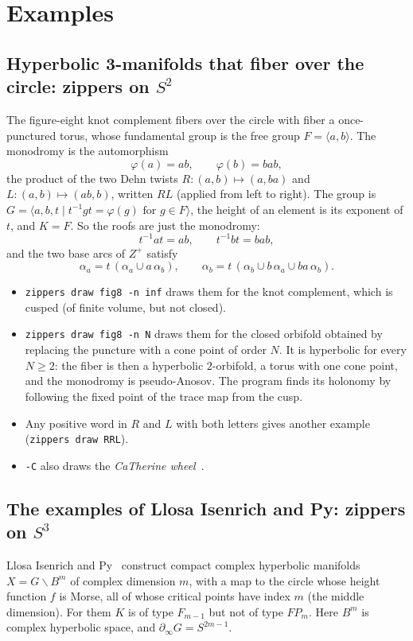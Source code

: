 \documentclass[11pt]{article}
\theoremstyle{remark}
\begin{document}
\section{Examples}

\subsection{Hyperbolic 3-manifolds that fiber over the circle: zippers on $S^2$}

The figure-eight knot complement fibers over the circle with fiber a once-punctured torus, whose fundamental group is the
free group $F=\langle a,b\rangle$. The monodromy is the automorphism
\[
\varphi(a)=ab,\qquad \varphi(b)=bab,
\]
the product of the two Dehn twists $R\colon(a,b)\mapsto(a,ba)$ and $L\colon(a,b)\mapsto(ab,b)$, written $RL$ (applied
from left to right). The group is $G=\langle a,b,t\mid t^{-1}gt=\varphi(g)\text{ for } g\in F\rangle$, the
height of an element is its exponent of $t$, and $K=F$. So the roofs are just the monodromy:
\[
t^{-1}at=ab,\qquad t^{-1}bt=bab,
\]
and the two base arcs of $Z^+$ satisfy
\[
\alpha_a=t\,(\alpha_a\cup a\,\alpha_b),\qquad \alpha_b=t\,(\alpha_b\cup b\,\alpha_a\cup ba\,\alpha_b).
\]
\begin{itemize}
\item \texttt{zippers draw fig8 -n inf} draws them for the knot complement, which is cusped (of finite volume, but not
closed).
\item \texttt{zippers draw fig8 -n N} draws them for the closed orbifold obtained by replacing the puncture with a cone point
of order $N$. It is hyperbolic for every $N\ge2$: the fiber is then a hyperbolic $2$-orbifold, a torus with one cone
point, and the monodromy is pseudo-Anosov. The program finds its holonomy by following the fixed point of the trace map
from the cusp.
\item Any positive word in $R$ and $L$ with both letters gives another example (\texttt{zippers draw RRL}).
\item \texttt{-C} also draws the \emph{CaTherine wheel}~\cite{CLwheels}.
\end{itemize}

\subsection{The examples of Llosa Isenrich and Py: zippers on $S^3$}

Llosa Isenrich and Py~\cite{LIP} construct compact complex hyperbolic manifolds $X=G\backslash B^m$ of complex
dimension $m$, with a map to the circle whose height function $f$ is Morse, all of whose critical points have index $m$
(the middle dimension). For them $K$ is of type $F_{m-1}$ but not of type $FP_m$. Here $B^m$ is complex hyperbolic space,
and $\partial_\infty G=S^{2m-1}$.
\end{document}

